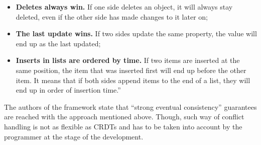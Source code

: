     \begin{itemize}
        \item {\textbf{Deletes always win.} If one side deletes an object, it will always stay deleted, even if the other side has made changes to it later on;}
        \item {\textbf{The last update wins.} If two sides update the same property, the value will end up as the last updated;}
        \item {\textbf{Inserts in lists are ordered by time.} If two items are inserted at the same position, the item that was inserted first will end up before the other item. It means that if both sides append items to the end of a list, they will end up in order of insertion time.}''\cite{22}
    \end{itemize}

The authors of the framework state that ``strong eventual consistency'' guarantees are reached\cite{22} with the approach mentioned above. Though, such way of conflict handling is not as flexible as CRDTs and has to be taken into account by the programmer at the stage of the development.